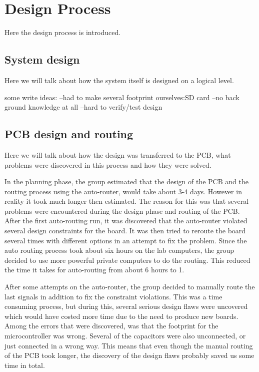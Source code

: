 \section {Design Process}

Here the design process is introduced.

\subsection{System design} \label{pcb:process:ss:system_design}

Here we will talk about how the system itself is designed on a logical level.


some write ideas:
--had to make several footprint ourselves:SD card
--no back ground knowledge at all
--hard to verify/test design

\subsection{PCB design and routing} \label{pcb:process:ss:pcb_design_and_soldering}

Here we will talk about how the design was transferred to the PCB, what problems were discovered in this process and how they were solved.

In the planning phase, the group estimated that the design of the PCB and the routing process using the auto-router, would take about 3-4 days. However in reality it took much longer then estimated. The reason for this was that several
problems were encountered during the design phase and routing of the PCB. After the first auto-routing run, it was discovered that the auto-router violated several design constraints for the board. It was then tried to reroute the board several times
with different options in an attempt to fix the problem. Since the auto routing process took about six hours on the lab computers, the group decided to use more powerful private computers to do the routing. This reduced the time it takes for auto-routing from about 6 hours to 1.

After some attempts on the auto-router, the group decided to manually route the last signals in addition to fix the constraint violations. This was a time consuming process, but during this, several serious design flaws were uncovered which would have costed
more time due to the need to produce new boards. Among the errors that were discovered, was that the footprint for the microcontroller was wrong. Several of the capacitors were also unconnected, or just connected in a wrong way. This means that even though the manual routing of the PCB took longer,
the discovery of the design flaws probably saved us some time in total.
